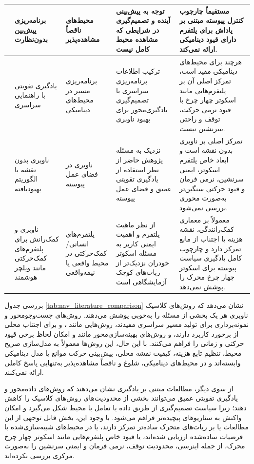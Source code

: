 \begin{longtable}{|C{2.35cm}|P{2.35cm}|P{2.65cm}|P{3.45cm}|P{3.95cm}|}
	\cite{Luo2025UP3} &
	برنامه‌ریزی پیش‌بین بدون‌نظارت  &
	محیط‌های ناقصاً مشاهده‌پذیر &
	توجه به پیش‌بینی آینده و تصمیم‌گیری در شرایطی که مشاهده محیط کامل نیست &
	مستقیماً چارچوب کنترل پیوسته مبتنی بر پاداش برای پلتفرم دارای قیود دینامیکی ارائه نمی‌کند. \\
	\hline
	
	\cite{Wang2020G2RL} &
	یادگیری تقویتی با راهنمایی سراسری &
	برنامه‌ریزی مسیر در محیط‌های دینامیکی &
	ترکیب اطلاعات برنامه‌ریزی سراسری با تصمیم‌گیری یادگیری‌محور برای بهبود ناوبری &
	هرچند برای محیط‌های دینامیکی مفید است، تمرکز اصلی آن بر پلتفرم‌هایی مانند اسکوتر چهار چرخ با قیود نرمی حرکت، توقف و راحتی سرنشین نیست. \\
	\hline
	
	\cite{Nasti2025MaplessTD3} &
	ناوبری بدون نقشه با الگوریتم بهبودیافته  &
	ناوبری  در فضای عمل پیوسته &
	نزدیک به مسئله پژوهش حاضر از نظر استفاده از یادگیری تقویتی عمیق و فضای عمل پیوسته &
	تمرکز اصلی بر ناوبری بدون نقشه است و ابعاد خاص پلتفرم اسکوتر، ایمنی سرنشین، نرمی فرمان و قیود حرکتی سنگین‌تر به‌صورت محوری بررسی نمی‌شود. \\
	\hline
	
	\cite{Pacini2024RLwheelchair,Cui2025OutdoorWheelchair} &
	ناوبری و کمک‌رانش برای پلتفرم‌های کمک‌حرکتی مانند ویلچر هوشمند &
	پلتفرم‌های انسانی/کمک‌حرکتی در محیط واقعی یا نیمه‌واقعی &
	از نظر ماهیت پلتفرم و اهمیت ایمنی کاربر به مسئله اسکوتر خودران نزدیک‌تر از ربات‌های کوچک آزمایشگاهی است &
	معمولاً بر معماری کمک‌رانندگی، نقشه هزینه یا اجتناب از مانع تمرکز دارد و چارچوب کامل یادگیری سیاست پیوسته برای اسکوتر چهار چرخ محرک را پوشش نمی‌دهد. \\
	\hline
	
\end{longtable}

\endgroup

بررسی جدول \ref{tab:nav_literature_comparison} نشان می‌دهد که روش‌های کلاسیک ناوبری هر یک بخشی از مسئله را به‌خوبی پوشش می‌دهند. روش‌های جست‌وجومحور و نمونه‌برداری برای تولید مسیر سراسری مفیدند، روش‌هایی مانند ،  و  برای اجتناب محلی از برخورد کاربرد دارند، و روش‌های بهینه‌سازی‌محور مانند  و  امکان لحاظ برخی قیود حرکتی و زمانی را فراهم می‌کنند. با این حال، این روش‌ها معمولاً به مدل‌سازی صریح محیط، تنظیم تابع هزینه، کیفیت نقشه محلی، پیش‌بینی حرکت موانع یا مدل دینامیکی وابسته‌اند و در محیط‌های دینامیکی، شلوغ و ناقصاً مشاهده‌پذیر به‌تنهایی پاسخ کاملی ارائه نمی‌کنند.

از سوی دیگر، مطالعات مبتنی بر یادگیری نشان می‌دهند که روش‌های داده‌محور و یادگیری تقویتی عمیق می‌توانند بخشی از محدودیت‌های روش‌های کلاسیک را کاهش دهند؛ زیرا سیاست تصمیم‌گیری از طریق داده یا تعامل با محیط شکل می‌گیرد و امکان واکنش به سناریوهای پیچیده‌تر فراهم می‌شود. با وجود این، بخش قابل توجهی از این مطالعات یا بر ربات‌های متحرک ساده‌تر تمرکز دارند، یا در محیط‌های شبیه‌سازی‌شده با فرضیات ساده‌شده ارزیابی شده‌اند، یا قیود خاص پلتفرم‌هایی مانند اسکوتر چهار چرخ محرک، از جمله اینرسی، محدودیت توقف، نرمی فرمان و ایمنی سرنشین را به‌صورت مرکزی بررسی نکرده‌اند.

